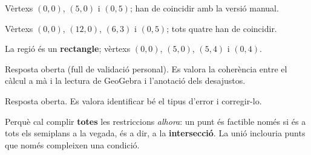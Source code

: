 \begin{solucions}
\begin{sollist}
  \item Vèrtexs $(0,0)$, $(5,0)$ i $(0,5)$; han de coincidir amb la versió manual.
  \item Vèrtexs $(0,0)$, $(12,0)$, $(6,3)$ i $(0,5)$; tots quatre han de coincidir.
  \item La regió és un \textbf{rectangle}; vèrtexs $(0,0)$, $(5,0)$, $(5,4)$ i $(0,4)$.
  \item Resposta oberta (full de validació personal). Es valora la coherència entre el
        càlcul a mà i la lectura de GeoGebra i l'anotació dels desajustos.
  \item Resposta oberta. Es valora identificar bé el tipus d'error i corregir-lo.
  \item Perquè cal complir \textbf{totes} les restriccions \emph{alhora}: un punt és
        factible només si és a tots els semiplans a la vegada, és a dir, a la
        \textbf{intersecció}. La unió inclouria punts que només compleixen una condició.
\end{sollist}
\end{solucions}
